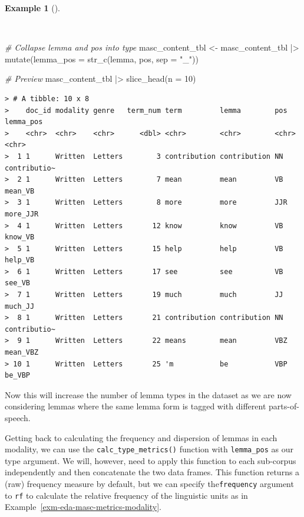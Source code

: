 \documentclass[
  letterpaper,
  DIV=11,
  numbers=noendperiod]{scrreprt}
\newenvironment{Shaded}{\begin{snugshade}}{\end{snugshade}}
\newcommand{\AttributeTok}[1]{\textcolor[rgb]{0.00,0.00,0.00}{#1}}
\newcommand{\CommentTok}[1]{\textcolor[rgb]{0.00,0.00,0.00}{\textit{#1}}}
\newcommand{\DecValTok}[1]{\textcolor[rgb]{0.00,0.00,0.00}{#1}}
\newcommand{\FunctionTok}[1]{\textcolor[rgb]{0.00,0.00,0.00}{#1}}
\newcommand{\NormalTok}[1]{\textcolor[rgb]{0.00,0.00,0.00}{#1}}
\newcommand{\OtherTok}[1]{\textcolor[rgb]{0.00,0.00,0.00}{#1}}
\newcommand{\SpecialCharTok}[1]{\textcolor[rgb]{0.00,0.00,0.00}{#1}}
\newcommand{\StringTok}[1]{\textcolor[rgb]{0.00,0.00,0.00}{#1}}
\theoremstyle{definition}
\newtheorem{example}{Example}[chapter]
\theoremstyle{remark}
\begin{document}
\begin{example}[]\protect\hypertarget{exm-eda-masc-type}{}\label{exm-eda-masc-type}

~

\begin{Shaded}
\begin{Highlighting}[]
\CommentTok{\# Collapse lemma and pos into type}
\NormalTok{masc\_content\_tbl }\OtherTok{\textless{}{-}}
\NormalTok{  masc\_content\_tbl }\SpecialCharTok{|\textgreater{}}
  \FunctionTok{mutate}\NormalTok{(}\AttributeTok{lemma\_pos =} \FunctionTok{str\_c}\NormalTok{(lemma, pos, }\AttributeTok{sep =} \StringTok{"\_"}\NormalTok{))}

\CommentTok{\# Preview}
\NormalTok{masc\_content\_tbl }\SpecialCharTok{|\textgreater{}}
  \FunctionTok{slice\_head}\NormalTok{(}\AttributeTok{n =} \DecValTok{10}\NormalTok{)}
\end{Highlighting}
\end{Shaded}

\begin{verbatim}
> # A tibble: 10 x 8
>    doc_id modality genre   term_num term         lemma        pos   lemma_pos   
>    <chr>  <chr>    <chr>      <dbl> <chr>        <chr>        <chr> <chr>       
>  1 1      Written  Letters        3 contribution contribution NN    contributio~
>  2 1      Written  Letters        7 mean         mean         VB    mean_VB     
>  3 1      Written  Letters        8 more         more         JJR   more_JJR    
>  4 1      Written  Letters       12 know         know         VB    know_VB     
>  5 1      Written  Letters       15 help         help         VB    help_VB     
>  6 1      Written  Letters       17 see          see          VB    see_VB      
>  7 1      Written  Letters       19 much         much         JJ    much_JJ     
>  8 1      Written  Letters       21 contribution contribution NN    contributio~
>  9 1      Written  Letters       22 means        mean         VBZ   mean_VBZ    
> 10 1      Written  Letters       25 'm           be           VBP   be_VBP
\end{verbatim}

\end{example}

Now this will increase the number of lemma types in the dataset as we
are now considering lemmas where the same lemma form is tagged with
different parts-of-speech.

Getting back to calculating the frequency and dispersion of lemmas in
each modality, we can use the \texttt{calc\_type\_metrics()} function
with \texttt{lemma\_pos} as our type argument. We will, however, need to
apply this function to each sub-corpus independently and then
concatenate the two data frames. This function returns a (raw) frequency
measure by default, but we can specify the\texttt{frequency} argument to
\texttt{rf} to calculate the relative frequency of the linguistic units
as in Example~\ref{exm-eda-masc-metrics-modality}.
\end{document}
